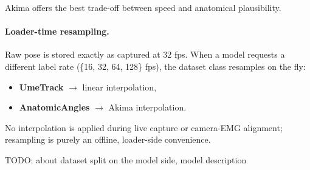 Akima offers the best trade-off between speed and anatomical plausibility.

\paragraph{Loader-time resampling.}
Raw pose is stored exactly as captured at 32 fps.  
When a model requests a different label rate (\{16, 32, 64, 128\} fps),
the dataset class resamples on the fly:

\begin{itemize}
  \item \textbf{UmeTrack} $\to$ linear interpolation,
  \item \textbf{AnatomicAngles} $\to$ Akima interpolation.
\end{itemize}

No interpolation is applied during live capture or camera-EMG alignment;
resampling is purely an offline, loader-side convenience.




TODO: about dataset split on the model side, model description
